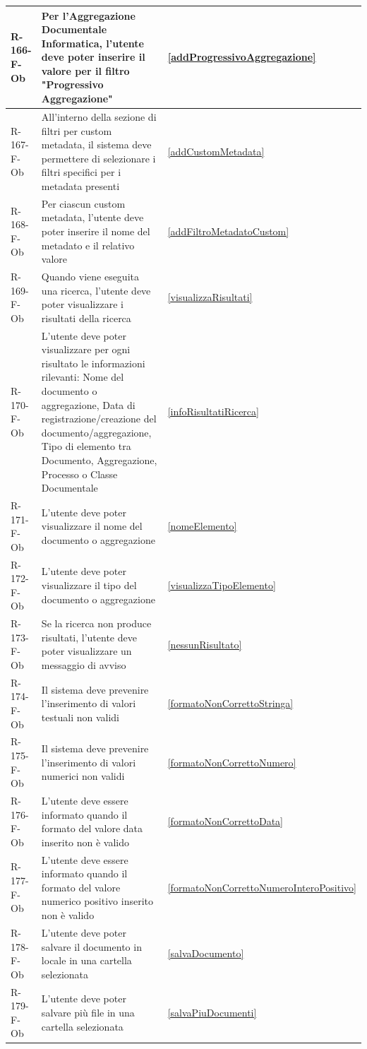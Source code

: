 \begin{longtable}{|p{2.5cm}|p{9.5cm}|p{2.5cm}|}
R-166-F-Ob & Per l'Aggregazione Documentale Informatica, l'utente deve poter inserire il valore per il filtro "Progressivo Aggregazione" & \ref{addProgressivoAggregazione} \\
\hline
R-167-F-Ob & All'interno della sezione di filtri per custom metadata, il sistema deve permettere di selezionare i filtri specifici per i metadata presenti & \ref{addCustomMetadata} \\
\hline
R-168-F-Ob & Per ciascun custom metadata, l'utente deve poter inserire il nome del metadato e il relativo valore & \ref{addFiltroMetadatoCustom} \\
\hline
R-169-F-Ob & Quando viene eseguita una ricerca, l'utente deve poter visualizzare i risultati della ricerca & \ref{visualizzaRisultati} \\
\hline
R-170-F-Ob & L'utente deve poter visualizzare per ogni risultato le informazioni rilevanti: Nome del documento o aggregazione, Data di registrazione/creazione del documento/aggregazione, Tipo di elemento tra Documento, Aggregazione, Processo o Classe Documentale & \ref{infoRisultatiRicerca} \\
\hline
R-171-F-Ob & L'utente deve poter visualizzare il nome del documento o aggregazione & \ref{nomeElemento} \\
\hline
R-172-F-Ob & L'utente deve poter visualizzare il tipo del documento o aggregazione & \ref{visualizzaTipoElemento} \\
\hline
R-173-F-Ob & Se la ricerca non produce risultati, l'utente deve poter visualizzare un messaggio di avviso & \ref{nessunRisultato} \\
\hline
R-174-F-Ob & Il sistema deve prevenire l'inserimento di valori testuali non validi & \ref{formatoNonCorrettoStringa} \\
\hline
R-175-F-Ob & Il sistema deve prevenire l'inserimento di valori numerici non validi & \ref{formatoNonCorrettoNumero} \\
\hline
R-176-F-Ob & L'utente deve essere informato quando il formato del valore data inserito non è valido & \ref{formatoNonCorrettoData} \\
\hline
R-177-F-Ob & L'utente deve essere informato quando il formato del valore numerico positivo inserito non è valido & \ref{formatoNonCorrettoNumeroInteroPositivo} \\
\hline
R-178-F-Ob & L'utente deve poter salvare il documento in locale in una cartella selezionata & \ref{salvaDocumento} \\
\hline
R-179-F-Ob & L'utente deve poter salvare più file in una cartella selezionata & \ref{salvaPiuDocumenti} \\

\end{longtable}
